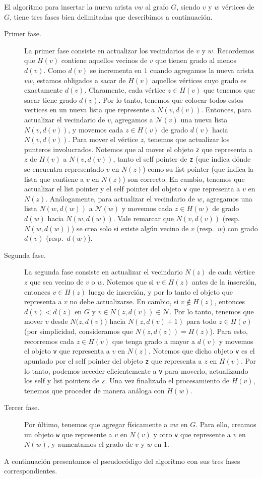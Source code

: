 \documentclass[a4paper,12pt]{article}
\newcommand{\N}{\mathcal{N}}
\begin{document}
El algoritmo para insertar la nueva arista $vw$ al grafo $G$, siendo $v$ y $w$ vértices de $G$, tiene tres fases bien delimitadas que describimos a continuación.
\begin{description}
\item [Primer fase.] La primer fase consiste en actualizar los vecindarios de $v$ y $w$.  Recordemos que $H(v)$ contiene aquellos vecinos de $v$ que tienen grado al menos $d(v)$.  Como $d(v)$ se incrementa en $1$ cuando agregamos la nueva arista $vw$, estamos obligados a sacar de $H(v)$ aquellos vértices cuyo grado es exactamente $d(v)$.  Claramente, cada vértice $z \in H(v)$ que tenemos que sacar tiene grado $d(v)$.  Por lo tanto, tenemos que colocar todos estos vertices en un nueva lista que represente a $N(v, d(v))$.  Entonces, para actualizar el vecindario de $v$,  agregamos a $\N(v)$ una nueva lista $N(v,d(v))$, y movemos cada $z \in H(v)$ de grado $d(v)$ hacia $N(v,d(v))$.  Para mover el vértice $z$, tenemos que actualizar los punteros involucrados.  Notemos que al mover el objeto \texttt{z} que representa a $z$ de $H(v)$ a $N(v, d(v))$, tanto el self pointer de \texttt{z} (que indica dónde se encuentra representado $v$ en $N(z)$) como su list pointer (que indica la lista que contiene a $v$ en $N(z)$) son correcto.  En cambio, tenemos que actualizar el list pointer y el self pointer del objeto \texttt{v} que representa a $v$ en $N(z)$.  Análogamente, para actualizar el vecindario de $w$, agregamos una lista $N(w, d(w))$ a $\N(w)$ y movemos cada $z \in H(w)$ de grado $d(w)$ hacia $N(w, d(w))$.  Vale remarcar que $N(v,d(v))$ (resp.\ $N(w, d(w))$) se crea solo si existe algún vecino de $v$ (resp.\ $w$) con grado $d(v)$ (resp.\ $d(w)$).  

\item [Segunda fase.]  La segunda fase consiste en actualizar el vecindario $N(z)$ de cada vértice $z$ que sea vecino de $v$ o $w$.  Notemos que si $v \in H(z)$ antes de la inserción, entonces $v \in H(z)$ luego de inserción, y por lo tanto el objeto que representa a $v$ no debe actualizarse.  En cambio, si $v \not\in H(z)$, entonces $d(v) < d(z)$ en $G$ y $v \in N(z, d(v)) \in \N$.  Por lo tanto, tenemos que mover $v$ desde $N(z,d(v)$) hacia $N(z, d(v)+1)$ para todo $z \in H(v)$ (por simplicidad, consideramos que $N(z, d(z)) = H(z)$).  Para esto, recorremos cada $z \in H(v)$ que tenga grado a mayor a $d(v)$ y movemos el objeto \texttt{v} que representa a $v$ en $N(z)$.  Notemos que dicho objeto \texttt{v} es el apuntado por el self pointer del objeto \texttt{z} que representa a $z$ en $H(v)$.  Por lo tanto, podemos acceder eficientemente a \texttt{v} para moverlo, actualizando los self y list pointers de \texttt{z}.  Una vez finalizado el procesamiento de $H(v)$, tenemos que proceder de manera análoga con $H(w)$.
%
\item [Tercer fase.] Por último, tenemos que agregar físicamente a $vw$ en $G$.  Para ello, creamos un objeto \texttt{w} que represente a $v$ en $N(v)$ y otro \texttt{v} que represente a $v$ en $N(w)$, y aumentamos el grado de $v$ y $w$ en $1$.
\end{description}
A continuación presentamos el pseudocódigo del algoritmo con sus tres fases correspondientes.
\end{document}
